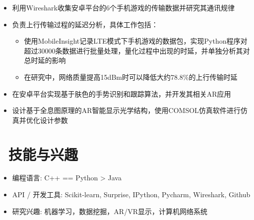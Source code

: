 \documentclass{resume}
\begin{document}
\begin{itemize}
  \item 利用Wireshark收集安卓平台的6个手机游戏的传输数据并研究其通讯规律
  \item 负责上行传输过程的延迟分析，具体工作包括：
  \begin{itemize}
    \item 使用MobileInsight记录LTE模式下手机游戏的数据包，实现Python程序对超过30000条数据进行批量处理，量化过程中出现的时延，并单独分析其对总时延的影响
    \item 在研究中，网络质量提高15dBm时可以降低大约78.8\%的上行传输时延
  \end{itemize}
\end{itemize}

\begin{itemize}
  \item 在安卓平台实现基于肤色的手势识别和跟踪算法，并开发其相关AR应用
  \item 设计基于全息图原理的AR智能显示光学结构，使用COMSOL仿真软件进行仿真并优化设计参数
\end{itemize}

\section{\faCogs\ 技能与兴趣}
\begin{itemize}[parsep=0.5ex]
  \item 编程语言: C++ == Python > Java
  \item API / 开发工具: Scikit-learn, Surprise, IPython, Pycharm, Wireshark, Github 
  \item 研究兴趣: 机器学习，数据挖掘，AR/VR显示，计算机网络系统 
\end{itemize}
\end{document}
